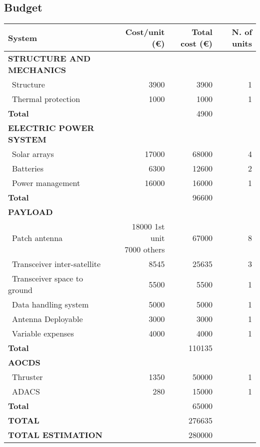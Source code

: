 \subsection{Budget}

\begin{longtable}{| l | r | r | r |}
\rowcolor[gray]{0.80}	\textbf{System} & \textbf{Cost/unit (\euro)} & \textbf{Total cost (\euro)} & \textbf{N. of units}\\
    \hline
    \endfirsthead


\rowcolor[gray]{0.85} \textbf{STRUCTURE AND MECHANICS} & & & \\
   ~Structure & 3900 & 3900 & 1 \\
   ~Thermal protection & 1000  & 1000 & 1\\
   \hline
   \rowcolor[gray]{0.95} \textbf{Total} &  & 4900 &  \\
   \hline
   
\rowcolor[gray]{0.85} \textbf{ELECTRIC POWER SYSTEM} & & & \\
   ~Solar arrays & 17000 & 68000 & 4 \\
   ~Batteries & 6300 & 12600 & 2 \\
   ~Power management & 16000 & 16000 & 1 \\
   \hline
   \rowcolor[gray]{0.95} \textbf{Total} & & 96600 &  \\
   \hline

\rowcolor[gray]{0.85} \textbf{PAYLOAD} & & & \\

   ~Patch antenna & \makecell{18000 1st unit \\ 7000 others} & 67000 & 8 \\
   ~Transceiver inter-satellite & 8545 & 25635 & 3 \\
   ~Transceiver space to ground & 5500  & 5500 & 1 \\
   ~Data handling system & 5000 & 5000 & 1\\
   ~Antenna Deployable & 3000 & 3000 & 1\\
   ~Variable expenses & 4000 & 4000 & 1\\
   \hline
   \rowcolor[gray]{0.95} \textbf{Total} & & 110135 & \\
   \hline
   
\rowcolor[gray]{0.85} \textbf{AOCDS} & & &\\

   ~Thruster & 1350 & 50000 & 1 \\
   ~ADACS & 280 & 15000 & 1 \\
   \hline
   \rowcolor[gray]{0.95} \textbf{Total} & & 65000 & \\
   \hline

\rowcolor[gray]{0.9} \textbf{TOTAL} & & 276635 & \\
\hline
\rowcolor[gray]{0.9} \textbf{TOTAL ESTIMATION} & & 280000 & \\
\hline

\end{longtable} 

